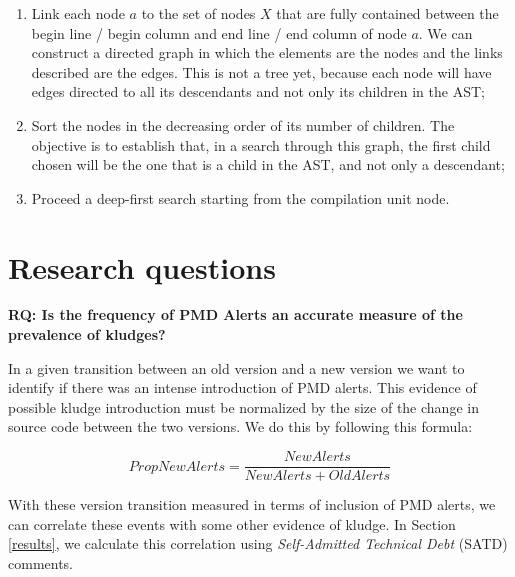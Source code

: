 \documentclass[
]{article}
\begin{document}
\begin{enumerate}
\item
  Link each node \(a\) to the set of nodes \(X\) that are fully
  contained between the begin line / begin column and end line / end
  column of node \(a\). We can construct a directed graph in which
  the elements are the nodes and the links described are the edges. This
  is not a tree yet, because each node will have edges directed to all
  its descendants and not only its children in the AST;

\item
  Sort the nodes in the decreasing order of its number of children. The
  objective is to establish that, in a search through this graph, the
  first child chosen will be the one that is a child in the AST, and not
  only a descendant;

\item
  Proceed a deep-first search starting from the compilation unit node.
\end{enumerate}


\section{Research questions}
\label{as_whole}

\noindent
\textbf{RQ: Is the frequency of PMD Alerts an accurate measure of the prevalence of kludges?}
\label{PMD_Kludge}

In a given transition between an old version and a new version we want
to identify if there was an intense introduction of PMD alerts. This
evidence of possible kludge introduction must be normalized by the size of the change in source code between the two versions. We do this by
following this formula:

\begin{equation}\label{eq_prop_new_alerts}
PropNewAlerts = \frac{NewAlerts}{NewAlerts + OldAlerts}    
\end{equation}

With these version transition measured in terms of inclusion of PMD
alerts, we can correlate these events with some other evidence of
kludge. In Section \ref{results}, we calculate this correlation using
\textit{Self-Admitted Technical Debt} (SATD) comments.

\vspace{16px}
\end{document}

